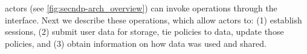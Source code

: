  \project{} %
\project{} actors (see \autoref{fig:secndp-arch_overview}) can invoke operations through the \project{} interface. Next we describe these operations, which allow actors to: (1) establish sessions, (2) submit user data for storage, tie policies to data, update those policies, and (3) obtain information on how data was used and shared.

